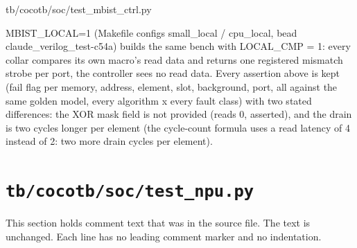 \begin{relocated}{tb/cocotb/soc/test_mbist_ctrl.py}
\begin{textblock}
MBIST_LOCAL=1 (Makefile configs small_local / cpu_local, bead claude_verilog_test-c54a) builds the same bench with
LOCAL_CMP = 1: every collar compares its own macro's read data and returns one registered mismatch strobe per
port, the controller sees no read data. Every assertion above is kept (fail flag per memory, address, element, slot,
background, port, all against the same golden model, every algorithm x every fault class) with two stated
differences: the XOR mask field is not provided (reads 0, asserted), and the drain is two cycles longer per element
(the cycle-count formula uses a read latency of 4 instead of 2: two more drain cycles per element).
\end{textblock}

\end{relocated}

\section{\texttt{tb/cocotb/soc/test\_npu.py}}\label{tm:suite:soc-test-npu}

This section holds comment text that was in the source file. The text is unchanged. Each line has no leading comment marker and no indentation.

